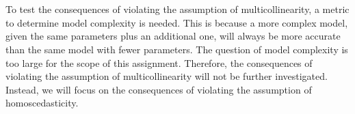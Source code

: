 \noindent\\\\
To test the consequences of violating the assumption of multicollinearity, a metric to determine model complexity is needed. This is because a more complex model, given the same parameters plus an additional one, will always be more accurate than the same model with fewer parameters. The question of model complexity is too large for the scope of this assignment. Therefore, the consequences of violating the assumption of multicollinearity will not be further investigated. Instead, we will focus on the consequences of violating the assumption of homoscedasticity. \newline



